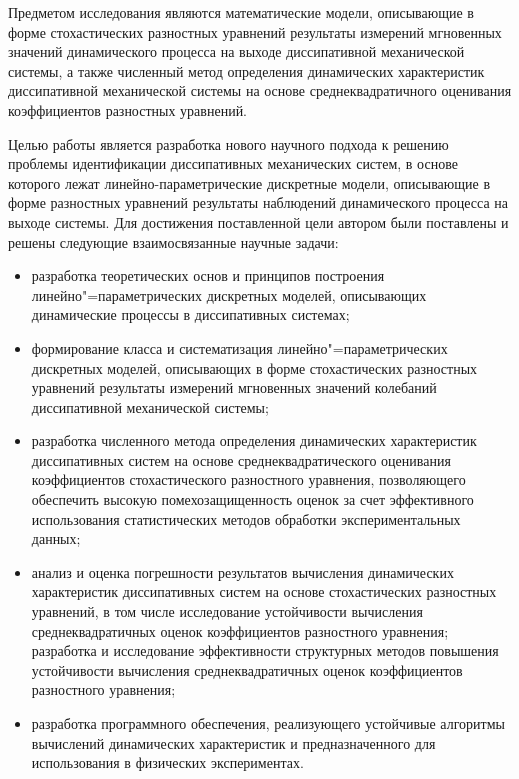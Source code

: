 {Предметом исследования являются математические модели, описывающие в форме стохастических разностных уравнений результаты измерений мгновенных значений динамического процесса на выходе диссипативной механической системы, а также численный метод определения динамических характеристик диссипативной механической системы на основе среднеквадратичного оценивания коэффициентов разностных уравнений.

Целью работы является разработка нового научного подхода к решению проблемы идентификации диссипативных механических систем, в основе которого лежат линейно-параметрические дискретные модели, описывающие в форме разностных уравнений результаты наблюдений динамического процесса на выходе системы.
Для достижения поставленной цели автором были поставлены и решены следующие взаимосвязанные научные задачи:
\begin{itemize}
\item[--] разработка теоретических основ и принципов построения  линейно"=параметрических дискретных моделей, описывающих динамические процессы в диссипативных системах;
\item[--] формирование класса и систематизация линейно"=параметрических дискретных моделей, описывающих в форме стохастических разностных уравнений результаты измерений мгновенных значений колебаний диссипативной механической системы;
\item[--] разработка численного метода определения динамических характеристик диссипативных систем на основе среднеквадратического оценивания коэффициентов стохастического разностного уравнения, позволяющего обеспечить высокую помехозащищенность оценок за счет эффективного использования статистических методов обработки экспериментальных данных; 
\item[--] анализ и оценка погрешности результатов вычисления динамических характеристик диссипативных систем на основе стохастических разностных уравнений, в том числе исследование устойчивости вычисления среднеквадратичных оценок коэффициентов разностного уравнения;
разработка и исследование эффективности структурных методов повышения устойчивости вычисления среднеквадратичных оценок коэффициентов разностного уравнения;
\item[--] разработка программного обеспечения, реализующего устойчивые алгоритмы вычислений динамических характеристик и предназначенного для использования в физических экспериментах.
\end{itemize}

\pagebreak

}
